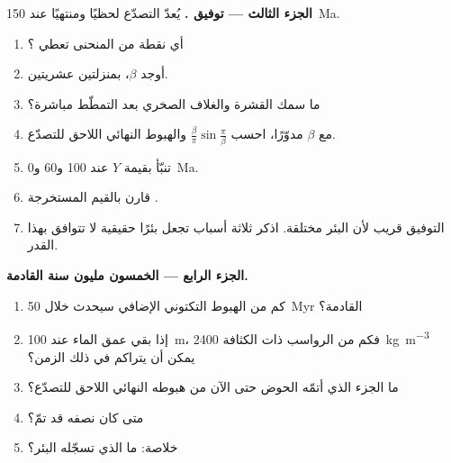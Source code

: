 \begin{problem}
\noindent\textbf{الجزء الثالث --- توفيق .} يُعدّ التصدّع لحظيًا
ومنتهيًا عند \qty{150}{Ma}.
\begin{enumerate}[resume]
  \item أي نقطة من المنحنى تعطي ؟
  \item أوجد  $\beta$، بمنزلتين عشريتين.
  \item ما سمك القشرة والغلاف الصخري بعد التمطّط مباشرة؟
  \item مع $\beta$ مدوّرًا، احسب $\frac{\beta}{\pi}\sin\frac{\pi}{\beta}$ والهبوط
        النهائي اللاحق للتصدّع.
  \item تنبّأ بقيمة $Y$ عند 100 و60 و\qty{0}{Ma}.
  \item قارن بالقيم المستخرجة .
  \item التوفيق قريب لأن البئر مختلقة. اذكر ثلاثة أسباب تجعل بئرًا حقيقية
        لا تتوافق بهذا القدر.
\end{enumerate}

\noindent\textbf{الجزء الرابع --- الخمسون مليون سنة القادمة.}
\begin{enumerate}[resume]
  \item كم من الهبوط التكتوني الإضافي سيحدث خلال \qty{50}{Myr} القادمة؟
  \item إذا بقي عمق الماء عند \qty{100}{m}، فكم من الرواسب ذات الكثافة
        \qty{2400}{kg.m^{-3}} يمكن أن يتراكم في ذلك الزمن؟
  \item ما الجزء الذي أتمّه الحوض حتى الآن من هبوطه النهائي اللاحق للتصدّع؟
  \item متى كان نصفه قد تمّ؟
  \item خلاصة: ما  الذي تسجّله البئر؟
\end{enumerate}
\end{problem}
